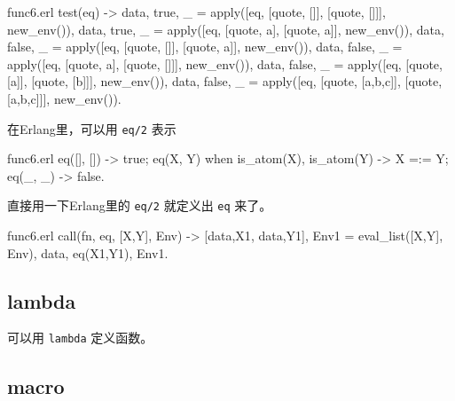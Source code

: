 \documentclass[preview,multi,crop=false,border=1in,class=memoir]{standalone}
\begin{document}
\begin{preview-page}
\begin{SourceCode}[151][169]{func6.erl}
test(eq) ->
    {{data, true}, _} =
        apply([eq, [quote, []], [quote, []]],
              new_env()),
    {{data, true}, _} =
        apply([eq, [quote, a], [quote, a]],
              new_env()),
    {{data, false}, _} =
        apply([eq, [quote, []], [quote, a]],
              new_env()),
    {{data, false}, _} =
        apply([eq, [quote, a], [quote, []]],
              new_env()),
    {{data, false}, _} =
        apply([eq, [quote, [a]], [quote, [b]]],
              new_env()),
    {{data, false}, _} =
        apply([eq, [quote, [a,b,c]], [quote, [a,b,c]]],
              new_env()).
\end{SourceCode}

在Erlang里，可以用 \verb|eq/2| 表示

\begin{SourceCode}[75][81]{func6.erl}
eq([], []) ->
    true;
eq(X, Y)
  when is_atom(X), is_atom(Y) ->
    X =:= Y;
eq(_, _) ->
    false.
\end{SourceCode}


直接用一下Erlang里的 \verb|eq/2| 就定义出 \verb|eq| 来了。

\begin{SourceCode}[50][53]{func6.erl}
call({fn, eq}, [X,Y], Env) ->
    {[{data,X1}, {data,Y1}], Env1} =
        eval_list([X,Y], Env),
    {{data, eq(X1,Y1)}, Env1}.
\end{SourceCode}

\subsection{lambda}

可以用 \verb|lambda| 定义函数。



\subsection{macro}

\begin{Exercise}[title={defun},difficulty=1]
\end{Exercise}



\end{preview-page}
\end{document}
